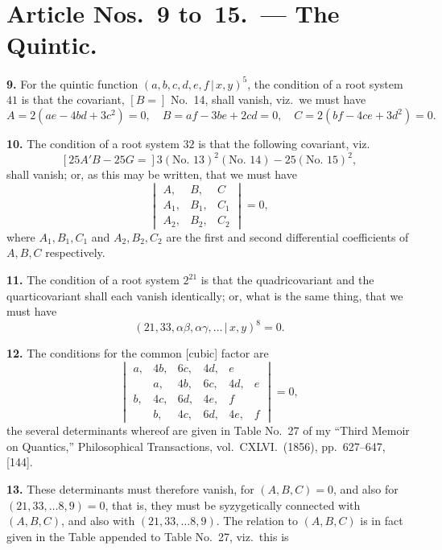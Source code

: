 \documentclass[11pt,a4paper]{article}
\begin{document}
\section*{Article Nos.~9 to~15.\ --- The Quintic.}

\textbf{9.} For the quintic function $(a,b,c,d,e,f\,\vert\,x,y)^5$, the condition of a root system $41$ is that the covariant, $[B =]$ No.~14, shall vanish, viz.\ we must have
\[
A = 2(ae - 4bd + 3c^2) = 0, \quad
B = af - 3be + 2cd = 0, \quad
C = 2(bf - 4ce + 3d^2) = 0.
\]

\textbf{10.} The condition of a root system $32$ is that the following covariant, viz.
\[
[25A'B - 25G =] 3(\text{No.~13})^2 (\text{No.~14}) - 25(\text{No.~15})^2,
\]
shall vanish; or, as this may be written, that we must have
\[
\begin{vmatrix}
A, & B, & C \\
A_1, & B_1, & C_1 \\
A_2, & B_2, & C_2
\end{vmatrix} = 0,
\]
where $A_1, B_1, C_1$ and $A_2, B_2, C_2$ are the first and second differential coefficients of $A, B, C$ respectively.

\textbf{11.} The condition of a root system $2^21$ is that the quadricovariant and the quarticovariant shall each vanish identically; or, what is the same thing, that we must have
\[
(21, 33, \alpha\beta, \alpha\gamma, \ldots \,\vert\, x, y)^8 = 0.
\]

\textbf{12.} The conditions for the common [cubic] factor are
\[
\begin{vmatrix}
a, & 4b, & 6c, & 4d, & e \\
  & a, & 4b, & 6c, & 4d, & e \\
b, & 4c, & 6d, & 4e, & f \\
  & b, & 4c, & 6d, & 4e, & f
\end{vmatrix} = 0,
\]
the several determinants whereof are given in Table No.~27 of my ``Third Memoir on Quantics,'' Philosophical Transactions, vol.~CXLVI.\ (1856), pp.~627--647, [144].

\textbf{13.} These determinants must therefore vanish, for $(A,B,C)=0$, and also for $(21, 33, \ldots 8, 9)=0$, that is, they must be syzygetically connected with $(A,B,C)$, and also with $(21, 33, \ldots 8, 9)$. The relation to $(A,B,C)$ is in fact given in the Table appended to Table No.~27, viz.\ this is
\end{document}
